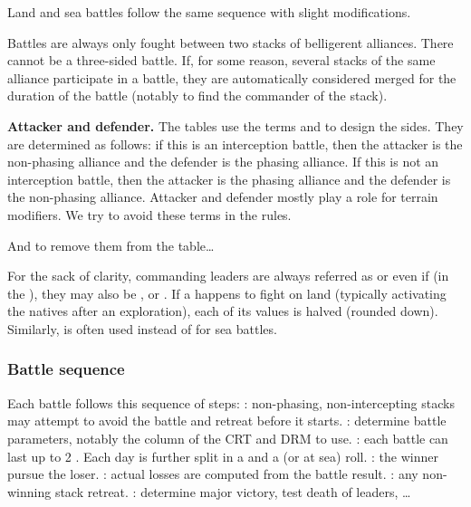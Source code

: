 Land and sea battles follow the same sequence with slight modifications.

Battles are always only fought between two stacks of belligerent
alliances. There cannot be a three-sided battle. If, for some reason, several
stacks of the same alliance participate in a battle, they are automatically
considered merged for the duration of the battle (notably to find the
commander of the stack).

\textbf{Attacker and defender.} The tables use the terms  and
 to design the sides. They are determined as follows: if this
is an interception battle, then the attacker is the non-phasing alliance and
the defender is the phasing alliance. If this is not an interception battle,
then the attacker is the phasing alliance and the defender is the non-phasing
alliance. Attacker and defender mostly play a role for terrain modifiers. We
try to avoid these terms in the rules.
\begin{todo}
  And to remove them from the table\ldots
\end{todo}

For the sack of clarity, commanding leaders are always referred as \LeaderG or
\LeaderA even if (in the \ROTW), they may also be \LeaderC, \LeaderGov or
\LeaderE. If a \LeaderE happens to fight on land (typically activating the
natives after an exploration), each of its values is halved (rounded
down). Similarly,  is often used instead of  for
sea battles.

\subsubsection{Battle sequence}
\aparag Each battle follows this sequence of steps:
\bparag {}: non-phasing, non-intercepting
  stacks may attempt to avoid the battle and retreat before it starts.
\bparag {}: determine battle parameters,
  notably the column of the CRT and DRM to use.
\bparag {}: each battle can last up to 2
  . Each day is further split in a  and a
   (or  at sea) roll.
\bparag {}: the winner pursue the loser.
\bparag {}: actual losses are
  computed from the battle result.
\bparag {}: any non-winning stack retreat.
\bparag {}: determine major victory, test
  death of leaders, \ldots

